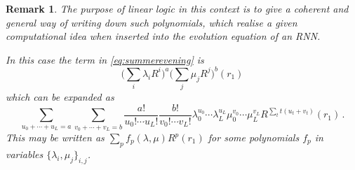 \documentclass[english,letter paper,12pt,leqno]{article}
\theoremstyle{example}
\newtheorem{remark}[theorem]{Remark}
\numberwithin{equation}{section}
\def\be{\begin{equation}}
\def\ee{\end{equation}}
\begin{document}
\begin{remark} The purpose of linear logic in this context is to give a coherent and general way of writing down such polynomials, which realise a given computational idea when inserted into the evolution equation of an RNN.

In this case the term in \eqref{eq:summerevening} is
\be\label{eq:crazyhorse_alt}
\big( \sum_i \lambda_i R^{i} \big)^a \big( \sum_j \mu_j R^{j} \big)^b (r_1)
\ee 
which can be expanded as
\be
\sum_{u_0 + \cdots + u_L = a}\sum_{v_0 + \cdots + v_L = b} \frac{a!}{u_0! \cdots u_L!} \frac{b!}{v_0! \cdots v_L!} \lambda_0^{u_0} \cdots \lambda_L^{u_L} \mu_0^{v_0} \cdots \mu_L^{v_L}  R^{\sum_t t (u_t + v_t)}(r_1)\,.
\ee
This may be written as $\sum_p f_p(\lambda, \mu) R^p(r_1)$ for some polynomials $f_p$ in variables $\{ \lambda_i, \mu_j \}_{i,j}$. 
\end{remark}
\end{document}
